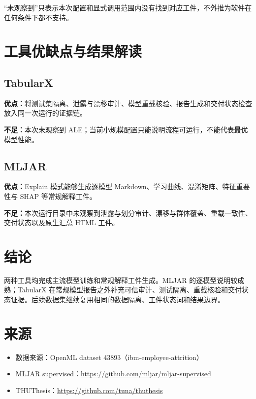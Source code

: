 \documentclass[degree=bachelor,language=chinese,fontset=fandol]{thuthesis}
\begin{document}
“未观察到”只表示本次配置和显式调用范围内没有找到对应工件，不外推为软件在任何条件下都不支持。

\chapter{工具优缺点与结果解读}
\section{TabularX}
\textbf{优点：}将测试集隔离、泄露与漂移审计、模型重载核验、报告生成和交付状态检查放入同一次运行的证据链。

\textbf{不足：}本次未观察到 ALE；当前小规模配置只能说明流程可运行，不能代表最优模型性能。

\section{MLJAR}
\textbf{优点：}Explain 模式能够生成逐模型 Markdown、学习曲线、混淆矩阵、特征重要性与 SHAP 等常规解释工件。

\textbf{不足：}本次运行目录中未观察到泄露与划分审计、漂移与群体覆盖、重载一致性、交付状态以及原生汇总 HTML 工件。

\chapter{结论}
两种工具均完成主流模型训练和常规解释工件生成。MLJAR 的逐模型说明较成熟；TabularX 在常规模型报告之外补充可信审计、测试隔离、重载核验和交付状态证据。后续数据集继续复用相同的数据隔离、工件状态词和结果边界。

\backmatter
\chapter{来源}
\begin{itemize}
  \item 数据来源：OpenML dataset 43893（ibm-employee-attrition）
  \item MLJAR supervised：\url{https://github.com/mljar/mljar-supervised}
  \item THUThesis：\url{https://github.com/tuna/thuthesis}
\end{itemize}
\end{document}
